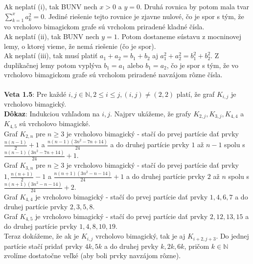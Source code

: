 \documentclass[12pt]{article}
\begin{document}
Ak neplatí (i), tak BUNV nech $x > 0$ a $y = 0$. Druhá rovnica by potom mala tvar $\sum_{k=1}^{x} a^2_k = 0$. Jediné riešenie tejto rovnice je zjavne nulové, čo je spor s tým, že vo vrcholovo bimagickom grafe sú vrcholom priradené kladné čísla.  \\

Ak neplatí (ii), tak BUNV nech $y = 1$. Potom dostaneme sústavu z mocninovej lemy, o ktorej vieme, že nemá riešenie (čo je spor). \\

Ak neplatí (iii), tak musí platiť $a_1 + a_2 = b_1 + b_2$ aj $a^2_1 + a^2_2 = b^2_1 + b^2_2$. Z duplikačnej lemy potom vyplýva $b_1 = a_1$ alebo $b_1 = a_2$,  čo je spor s tým, že vo vrcholovo bimagickom grafe sú vrcholom priradené navzájom rôzne čísla. \\\\

\textbf{Veta 1.5}: Pre každé  $i,j \in \mathbb{N}, 2 \leq i \leq j, (i, j) \neq (2, 2)$ platí, že graf $K_{i,j}$ je vrcholovo bimagický. \\

\textbf{Dôkaz}: Indukciou vzhľadom na $i,j$. Najprv ukážeme, že grafy $K_{2,j}, K_{3,j}, K_{4,4}$ a $K_{4,5}$ sú vrcholovo bimagické. \\

Graf $K_{2,n}$ pre $n \geq 3$ je vrcholovo bimagický - stačí do prvej partície dať prvky $\frac{n(n-1)}{2} + 1$ a $\frac{n(n-1)(3n^2 - 7n + 14)}{24}$ a do druhej partície prvky $1$ až $n - 1$ spolu s $\frac{n(n-1)(3n^2 - 7n + 14)}{24} + 1$. \\

Graf $K_{3,n}$ pre $n \geq 3$ je vrcholovo bimagický - stačí do prvej partície dať prvky $1, \frac{n(n+1)}{2} - 1$ a $\frac{n(n+1)(3n^2 - n - 14)}{24} + 1$ a do druhej partície prvky $2$ až $n$ spolu s $\frac{n(n+1)(3n^2 - n - 14)}{24} + 2$. \\

Graf $K_{4,4}$ je vrcholovo bimagický - stačí do prvej partície dať prvky $1, 4, 6, 7$ a do druhej partície prvky $2, 3, 5, 8$. \\

Graf $K_{4,5}$ je vrcholovo bimagický - stačí do prvej partície dať prvky $2, 12, 13, 15$ a do druhej partície prvky $1, 4, 8, 10, 19$. \\

Teraz dokážeme, že ak je $K_{i,j}$ vrcholovo bimagický, tak je aj $K_{i+2,j+3}$. Do jednej partície stačí pridať prvky $4k, 5k$ a do druhej prvky $k, 2k, 6k$, pričom $k \in \mathbb{N}$ zvolíme dostatočne veľké (aby boli prvky navzájom rôzne). \\\\ 
\end{document}
